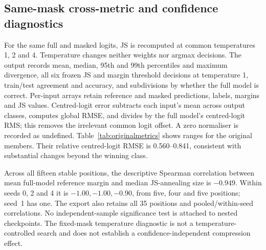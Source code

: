 \documentclass[10pt]{article}
\begin{document}
\subsection{Same-mask cross-metric and confidence diagnostics}
For the same full and masked logits, JS is recomputed at common temperatures 1, 2 and 4. Temperature changes neither weights nor argmax decisions. The output records mean, median, 95th and 99th percentiles and maximum divergence, all six frozen JS and margin threshold decisions at temperature 1, train/test agreement and accuracy, and subdivisions by whether the full model is correct. Per-input arrays retain reference and masked predictions, labels, margins and JS values. Centred-logit error subtracts each input's mean across output classes, computes global RMSE, and divides by the full model's centred-logit RMS; this removes the irrelevant common logit offset. A zero normaliser is recorded as undefined. Table~\ref{tab:originalmetrics} shows ranges for the original members. Their relative centred-logit RMSE is 0.560--0.841, consistent with substantial changes beyond the winning class.


Across all fifteen stable positions, the descriptive Spearman correlation between mean full-model reference margin and median JS-annealing size is $-0.949$. Within seeds 0, 2 and 4 it is $-1.00,-1.00,-0.90$, from five, four and five positions; seed~1 has one. The export also retains all 35 positions and pooled/within-seed correlations. No independent-sample significance test is attached to nested checkpoints. The fixed-mask temperature diagnostic is not a temperature-controlled search and does not establish a confidence-independent compression effect.
\end{document}
